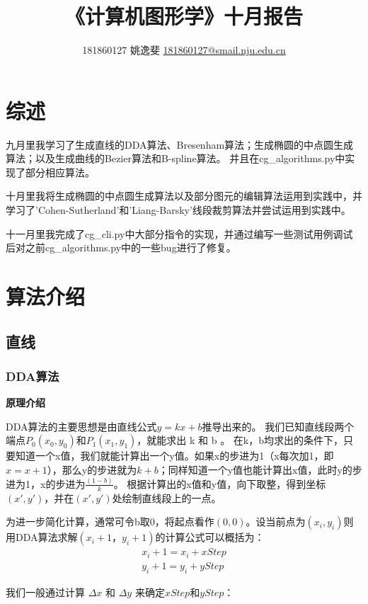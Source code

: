 \documentclass[a4paper,UTF8]{article}
\theoremstyle{definition}
\begin{document}
\title{\textbf{《计算机图形学》十月报告}}
\author{181860127   姚逸斐  \href{mailto:181860127@smail.nju.edu.cn}{181860127@smail.nju.edu.cn}}
\maketitle

\section{综述}
九月里我学习了生成直线的DDA算法、Bresenham算法；生成椭圆的中点圆生成算法；以及生成曲线的Bezier算法和B-spline算法。
并且在cg\_algorithms.py中实现了部分相应算法。

十月里我将生成椭圆的中点圆生成算法以及部分图元的编辑算法运用到实践中，并学习了'Cohen-Sutherland'和'Liang-Barsky'线段裁剪算法并尝试运用到实践中。

十一月里我完成了cg\_cli.py中大部分指令的实现，并通过编写一些测试用例调试后对之前cg\_algorithms.py中的一些bug进行了修复。

\section{算法介绍}
\subsection{直线}

\subsubsection{DDA算法}
\textbf{原理介绍}\par
DDA算法的主要思想是由直线公式$y = kx + b$推导出来的。
我们已知直线段两个端点$P_0(x_0,y_0)$和$P_1(x_1,y_1)$，就能求出 k 和 b 。
在k，b均求出的条件下，只要知道一个x值，我们就能计算出一个y值。如果x的步进为1（x每次加1，即$x = x +1$），那么y的步进就为$k+b$；同样知道一个y值也能计算出x值，此时y的步进为1，x的步进为$\frac{(1-b)}{k}$。
根据计算出的x值和y值，向下取整，得到坐标$(x',y')$，并在$(x',y')$处绘制直线段上的一点。

为进一步简化计算，通常可令b取0，将起点看作$(0,0)$。设当前点为$(x_i, y_i)$则用DDA算法求解$(x_i+1，y_i+1)$的计算公式可以概括为：
\begin{align}
    x_i+1 = x_i + xStep \\
    y_i+1 = y_i + yStep 
\end{align}

我们一般通过计算 $Δx$ 和 $Δy$ 来确定$xStep$和$yStep$：
\end{document}
